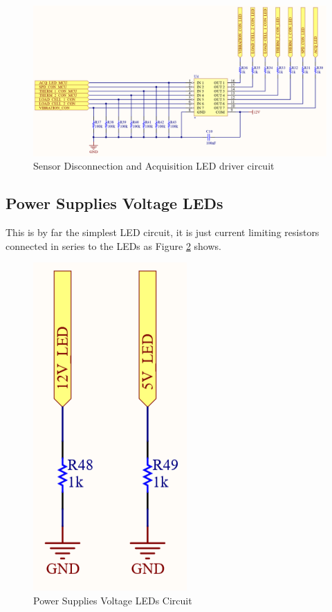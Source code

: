 			\begin{figure}[htbp]
				\centering
					\includegraphics[scale=1]{figuras/fig-leds-sensor-disconnection-acquisition-circuit.png}
				\caption{Sensor Disconnection and Acquisition LED driver circuit \cite{leds-sensor-disconnection-acquisition-circuit}}
				\label{fig:leds-sensor-disconnection-acquisition-circuit}
			\end{figure}

	\subsection{Power Supplies Voltage LEDs}\label{ssec:power-supplis-voltage-leds}

		This is by far the simplest LED circuit, it is just current limiting resistors connected in series to the LEDs as Figure \ref{fig:power-supplies-leds} shows.

			\begin{figure}[htbp]
				\centering
					\includegraphics[scale=1]{figuras/fig-power-supplies-leds.png}
				\caption{Power Supplies Voltage LEDs Circuit \cite{power-supplies-leds}}
				\label{fig:power-supplies-leds}
			\end{figure}